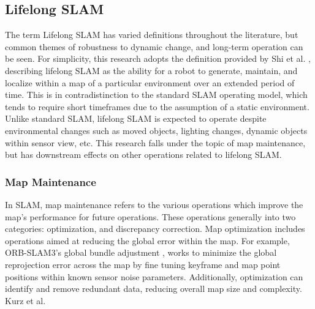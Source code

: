 \subsection{Lifelong SLAM}

The term Lifelong SLAM has varied definitions throughout the literature, but common themes of robustness to dynamic change, and long-term operation can be seen. For simplicity, this research adopts the definition provided by Shi et al. \cite{shiAreWeReady2020}, describing lifelong SLAM as the ability for a robot to generate, maintain, and localize within a map of a particular environment over an extended period of time. This is in contradistinction to the standard SLAM operating model, which tends to require short timeframes due to the assumption of a static environment. Unlike standard SLAM, lifelong SLAM is expected to operate despite environmental changes such as moved objects, lighting changes, dynamic objects within sensor view, etc. This research falls under the topic of map maintenance, but has downstream effects on other operations related to lifelong SLAM.

\subsubsection{Map Maintenance}

In SLAM, map maintenance refers to the various operations which improve the map's performance for future operations. These operations generally into two categories: optimization, and discrepancy correction. Map optimization includes operations aimed at reducing the global error within the map. For example, ORB-SLAM3's global bundle adjustment \cite{camposORBSLAM3AccurateOpenSource2021}, works to minimize the global reprojection error across the map by fine tuning keyframe and map point positions within known sensor noise parameters. Additionally, optimization can identify and remove redundant data, reducing overall map size and complexity. Kurz et al. 